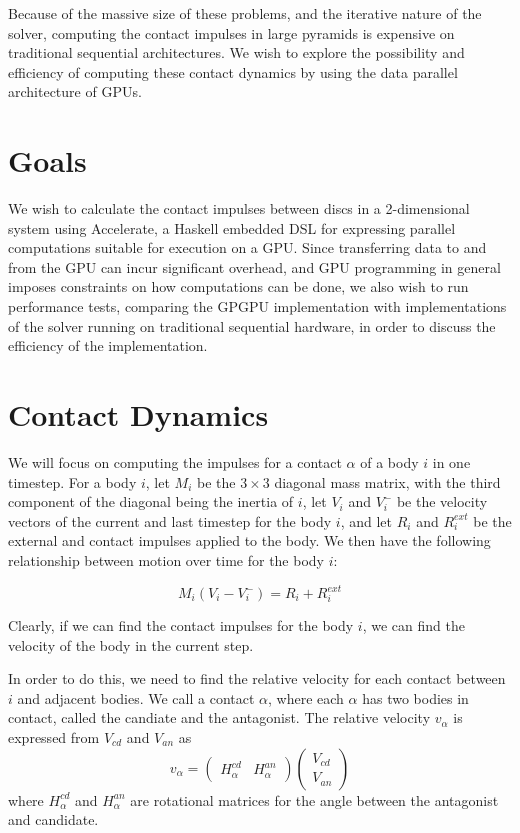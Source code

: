 \documentclass[runningheads,a4paper]{llncs}
\begin{document}
Because of the massive size of these problems, and the iterative nature of the
solver, computing the contact impulses in large pyramids is expensive on
traditional sequential architectures. We wish to explore the possibility and
efficiency of computing these contact dynamics by using the data parallel
architecture of GPUs.

\section{Goals}

We wish to calculate the contact impulses between discs in a 2-dimensional
system using Accelerate, a Haskell embedded DSL for expressing parallel
computations suitable for execution on a GPU. Since transferring data to and
from the GPU can incur significant overhead, and GPU programming in general
imposes constraints on how computations can be done, we also wish to run
performance tests, comparing the GPGPU implementation with implementations of
the solver running on traditional sequential hardware, in order to discuss the
efficiency of the implementation.

\section{Contact Dynamics}

We will focus on computing the impulses for a contact $\alpha$ of a body $i$ in
one timestep. For a body $i$, let $M_i$ be the $3 \times 3$ diagonal mass
matrix, with the third component of the diagonal being the inertia of $i$, let
$V_i$ and $V_i^-$ be the velocity vectors of the current and last timestep for
the body $i$, and let $R_i$ and $R_i^{ext}$ be the external and contact impulses
applied to the body. We then have the following relationship between motion
over time for the body $i$:

\begin{equation}
  M_i(V_i - V_i^-) = R_i + R_i^{ext}
\end{equation}

Clearly, if we can find the contact impulses for the body $i$, we can find the
velocity of the body in the current step.

In order to do this, we need to find the relative velocity for each contact
between $i$ and adjacent bodies. We call a contact $\alpha$, where each
$\alpha$ has two bodies in contact, called the candiate and the antagonist. The
relative velocity $v_\alpha$ is expressed from $V_{cd}$ and $V_{an}$ as
\begin{equation}
  v_\alpha =
  \begin{pmatrix}
    H_\alpha^{cd} &
    H_\alpha^{an}
  \end{pmatrix}
  \begin{pmatrix}
    V_{cd} \\
    V_{an}
  \end{pmatrix}
\end{equation}
where $H_\alpha^{cd}$ and $H_\alpha^{an}$ are rotational matrices for the angle
between the antagonist and candidate.
\end{document}
